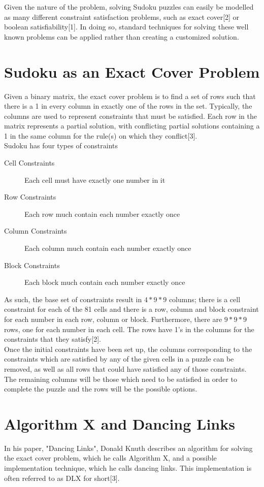\documentclass[12pt]{article}
\newcounter{row}
\newcounter{col}
\begin{document}
Given the nature of the problem, solving Sudoku puzzles can easily be modelled as many different constraint satisfaction problems, such as exact cover[2] or boolean satisfiability[1]. In doing so, standard techniques for solving these well known problems can be applied rather than creating a customized solution.  \\

\section{Sudoku as an Exact Cover Problem}
Given a binary matrix, the exact cover problem is to find a set of rows such that there is a 1 in every column in exactly one of the rows in the set. Typically, the columns are used to represent constraints that must be satisfied. Each row in the matrix represents a partial solution, with conflicting partial solutions containing a 1 in the same column for the rule(s) on which they conflict[3]. \\

Sudoku has four types of constraints
\begin{description}
\item[Cell Constraints] Each cell must have exactly one number in it
\item[Row Constraints] Each row much contain each number exactly once
\item[Column Constraints] Each column much contain each number exactly once
\item[Block Constraints] Each block much contain each number exactly once
\end{description}
As such, the base set of constraints result in $4*9*9$ columns; there is a cell constraint for each of the 81 cells and there is a row, column and block constraint for each number in each row, column or block. Furthermore, there are $9*9*9$ rows, one for each number in each cell. The rows have 1's in the columns for the constraints that they satisfy[2]. \\

Once the initial constraints have been set up, the columns corresponding to the constraints which are satisfied by any of the given cells in a puzzle can be removed, as well as all rows that could have satisfied any of those constraints. The remaining columns will be those which need to be satisfied in order to complete the puzzle and the rows will be the possible options.
\section{Algorithm X and Dancing Links}
In his paper, "Dancing Links", Donald Knuth describes an algorithm for solving the exact cover problem, which he calls Algorithm X, and a possible implementation technique, which he calls dancing links. This implementation is often referred to as DLX for short[3]. \\
\end{document}
